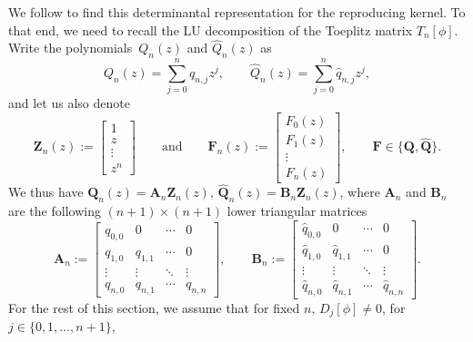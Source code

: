 \documentclass[pdftex]{sigma}
\numberwithin{equation}{section}
\newcommand{\qandq}{\qquad \text{and} \qquad}
\begin{document}
		We follow \cite{GW} to find this determinantal representation for the reproducing kernel. To that end, we need to recall the LU decomposition of the Toeplitz matrix $T_n[\phi]$. Write the polynomials~$Q_n(z)$ and $\widehat{Q}_n(z)$ as
		\begin{equation*}
			Q_n(z) = \sum_{j=0}^{n} q_{n,j} z^j, \qquad \widehat{Q}_n(z) = \sum_{j=0}^{n} \hat{q}_{n,j} z^j,
		\end{equation*}
		and let us also denote
		\begin{equation*}
			\boldsymbol{Z}_n(z) := \begin{bmatrix}
				1 \\ z \\ \vdots \\ z^{n}
			\end{bmatrix} \qandq \boldsymbol{F}_n(z) := \begin{bmatrix}
				F_0(z) \\ F_1(z) \\ \vdots \\ F_n(z)
			\end{bmatrix}, \qquad \boldsymbol{F} \in \big\{\boldsymbol{Q},\boldsymbol{\widehat{Q}}\big\}.
		\end{equation*}
		We thus have $\boldsymbol{Q}_n(z) = \boldsymbol{A}_{n} \boldsymbol{Z}_n(z)$, $\boldsymbol{\widehat{Q}}_n(z) = \boldsymbol{B}_{n} \boldsymbol{Z}_n(z)$,
		where $\boldsymbol{A}_{n}$ and $ \boldsymbol{B}_{n}$ are the following $(n+1)\times(n+1)$ lower triangular matrices
		\begin{equation}\label{An Bn}
			\boldsymbol{A}_{n} := \begin{bmatrix}
				q_{0,0} & 0 & \cdots & 0 \\
				q_{1,0} & q_{1,1} & \cdots & 0 \\
				\vdots & \vdots & \ddots & \vdots \\
				q_{n,0} & q_{n,1} & \cdots & q_{n,n}
			\end{bmatrix}, \qquad 	\boldsymbol{B}_{n} := \begin{bmatrix}
				\hat{q}_{0,0} & 0 & \cdots & 0 \\
				\hat{q}_{1,0} & \hat{q}_{1,1} & \cdots & 0 \\
				\vdots & \vdots & \ddots & \vdots \\
				\hat{q}_{n,0} & \hat{q}_{n,1} & \cdots & \hat{q}_{n,n}
			\end{bmatrix}.
		\end{equation}
		For the rest of this section, we assume that for fixed $n$, $D_j[\phi] \neq 0$, for $j \in\{0,1,\dots,n+1\}$,
\end{document}
